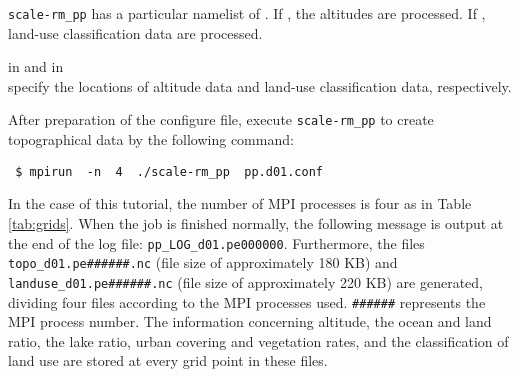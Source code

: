 \verb|scale-rm_pp| has a particular namelist of .
If , the altitudes are processed.
If , land-use classification data are processed.

 in 
and  in\\  specify the locations of altitude data and land-use classification data, respectively.

After preparation of the configure file,
execute \verb|scale-rm_pp| to create topographical data by the following command:
\begin{verbatim}
 $ mpirun  -n  4  ./scale-rm_pp  pp.d01.conf
\end{verbatim}
In the case of this tutorial, the number of MPI processes is four as in Table \ref{tab:grids}.
When the job is finished normally, 
the following message is output at the end of the log file: \verb|pp_LOG_d01.pe000000|.
Furthermore, the files \verb|topo_d01.pe######.nc| (file size of approximately 180 KB)  and\\
\verb|landuse_d01.pe######.nc| (file size of approximately 220 KB)  are generated,
dividing four files according to the MPI processes used.
\verb|######| represents the MPI process number.
The information concerning altitude, the ocean and land ratio, the lake ratio, urban covering and vegetation rates, and the classification of land use are stored at every grid point in these files. 


